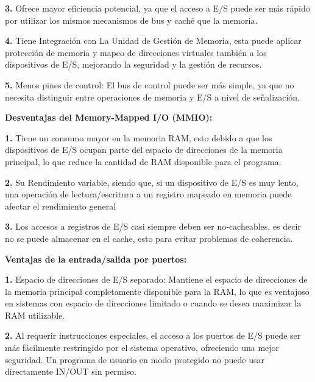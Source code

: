 \documentclass{article}
\begin{document}
\quad

\textbf{3.   }{Ofrece mayor eficiencia potencial, ya que el acceso a E/S puede ser más rápido por utilizar los mismos mecanismos de bus y caché que la memoria.}

\quad

\textbf{4.   }{Tiene Integración con La Unidad de Gestión de Memoria, esta puede aplicar protección de memoria y mapeo de direcciones virtuales también a los dispositivos de E/S, mejorando la seguridad y la gestión de recursos.}

\quad

\textbf{5.   }{Menos pines de control: El bus de control puede ser más simple, ya que no necesita distinguir entre operaciones de memoria y E/S a nivel de señalización.}

\quad

\textbf{Desventajas del Memory-Mapped I/O (MMIO):}

\quad

\textbf{1.   }{Tiene un consumo mayor en la memoria RAM, esto debido a que los dispositivos de E/S ocupan parte del espacio de direcciones de la memoria principal, lo que reduce la cantidad de RAM disponible para el programa.}

\quad

\textbf{2.   }{Su Rendimiento variable, siendo que, si un dispositivo de E/S es muy lento, una operación de lectura/escritura a un registro mapeado en memoria puede afectar el rendimiento general}

\quad

\textbf{3.   }{Los accesos a registros de E/S casi siempre deben ser no-cacheables, es decir no se puede almacenar en el cache, esto para evitar problemas de coherencia.}

\quad

\textbf{Ventajas de la entrada/salida por puertos:}

\quad

\textbf{1.   }{Espacio de direcciones de E/S separado: Mantiene el espacio de direcciones de la memoria principal completamente disponible para la RAM, lo que es ventajoso en sistemas con espacio de direcciones limitado o cuando se desea maximizar la RAM utilizable.}

\quad

\textbf{2.   }{Al requerir instrucciones especiales, el acceso a los puertos de E/S puede ser más fácilmente restringido por el sistema operativo, ofreciendo una mejor seguridad. Un programa de usuario en modo protegido no puede usar directamente IN/OUT sin permiso.}
\end{document}
